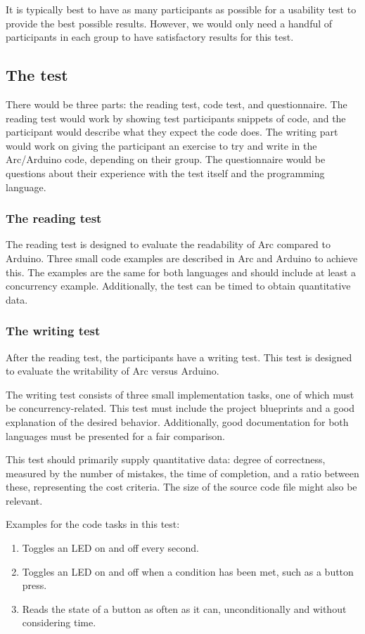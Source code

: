 It is typically best to have as many participants as possible for a usability test to provide the best possible results. However, we would only need a handful of participants in each group to have satisfactory results for this test.

\subsection{The test}\label{subsubsec:theTestSession}
There would be three parts: the reading test, code test, and questionnaire. The reading test would work by showing test participants snippets of code, and the participant would describe what they expect the code does. The writing part would work on giving the participant an exercise to try and write in the Arc/Arduino code, depending on their group. The questionnaire would be questions about their experience with the test itself and the programming language. 

\subsubsection{The reading test}
The reading test is designed to evaluate the readability of Arc compared to Arduino. Three small code examples are described in Arc and Arduino to achieve this. The examples are the same for both languages and should include at least a concurrency example. Additionally, the test can be timed to obtain quantitative data. 

\subsubsection{The writing test}
After the reading test, the participants have a writing test. This test is designed to evaluate the writability of Arc versus Arduino. 

The writing test consists of three small implementation tasks, one of which must be concurrency-related. This test must include the project blueprints and a good explanation of the desired behavior. Additionally, good documentation for both languages must be presented for a fair comparison. 

This test should primarily supply quantitative data: degree of correctness, measured by the number of mistakes, the time of completion, and a ratio between these, representing the cost criteria. The size of the source code file might also be relevant. 

Examples for the code tasks in this test:
\begin{enumerate}
    \item Toggles an LED on and off every second.
    \item Toggles an LED on and off when a condition has been met, such as a button press.
    \item Reads the state of a button as often as it can, unconditionally and without considering time.
\end{enumerate}

